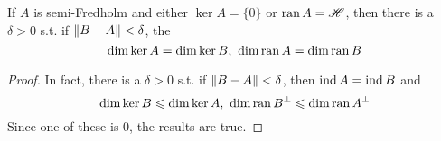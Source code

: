 \documentclass[a4paper,11pt]{report}
\begin{document}
\begin{prop}
	If $A$ is semi-Fredholm and either $\ker{A} = \{0\}$ or $\operatorname{ran}{A} = \mathscr{H}$, then there is a $\delta > 0$ s.t. if $\left\lVert B-A\right\lVert < \delta$, the 
	\begin{equation*}
		\dim{\ker{A}} = \dim{\ker{B}},~ \dim{\operatorname{ran}{A}} = \dim{\operatorname{ran}{B}}
	\end{equation*}
\end{prop}
\begin{proof}
	In fact, there is a $\delta > 0$ s.t. if $\left\lVert B-A\right\lVert < \delta$, then $\operatorname{ind}{A} = \operatorname{ind}{B}$ and 
	\begin{equation*}
		\dim{\ker{B}} \leqslant \dim{\ker{A}},~ \dim{\operatorname{ran}{B}^{\bot}} \leqslant \dim{\operatorname{ran}{A}^{\bot}}
	\end{equation*}
	Since one of these is $0$, the results are true.
\end{proof}
\end{document}
